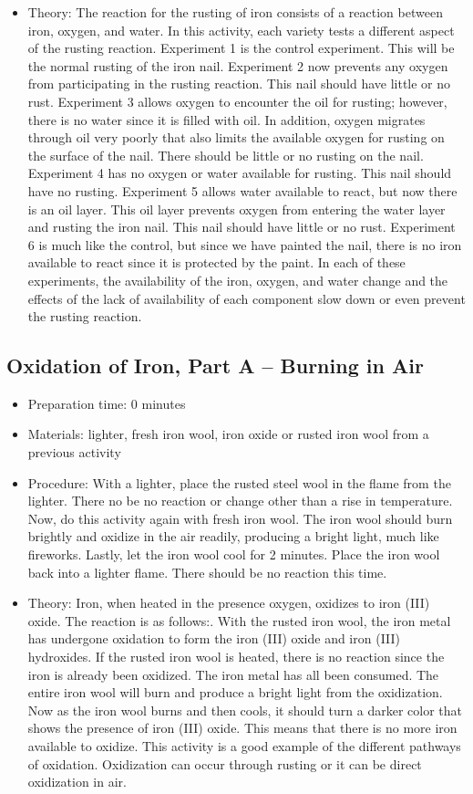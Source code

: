 \begin{itemize}
\item{Theory: The reaction for the rusting of iron consists of a reaction between iron, oxygen, and water. In this activity, each variety tests a different aspect of the rusting reaction. Experiment 1 is the control experiment. This will be the normal rusting of the iron nail. Experiment 2 now prevents any oxygen from participating in the rusting reaction. This nail should have little or no rust. Experiment 3 allows oxygen to encounter the oil for rusting; however, there is no water since it is filled with oil. In addition, oxygen migrates through oil very poorly that also limits the available oxygen for rusting on the surface of the nail. There should be little or no rusting on the nail. Experiment 4 has no oxygen or water available for rusting. This nail should have no rusting. Experiment 5 allows water available to react, but now there is an oil layer. This oil layer prevents oxygen from entering the water layer and rusting the iron nail. This nail should have little or no rust. Experiment 6 is much like the control, but since we have painted the nail, there is no iron available to react since it is protected by the paint. In each of these experiments, the availability of the iron, oxygen, and water change and the effects of the lack of availability of each component slow down or even prevent the rusting reaction.}
\end{itemize}

\subsection{Oxidation of Iron, Part A -- Burning in Air}
\begin{itemize}
\item{Preparation time: 0 minutes}
\item{Materials: lighter, fresh iron wool, iron oxide or rusted iron wool from a previous activity}
\item{Procedure: With a lighter, place the rusted steel wool in the flame from the lighter. There no be no reaction or change other than a rise in temperature. Now, do this activity again with fresh iron wool. The iron wool should burn brightly and oxidize in the air readily, producing a bright light, much like fireworks. Lastly, let the iron wool cool for 2 minutes. Place the iron wool back into a lighter flame. There should be no reaction this time.}
\item{Theory: Iron, when heated in the presence oxygen, oxidizes to iron (III) oxide. The reaction is as follows:. With the rusted iron wool, the iron metal has undergone oxidation to form the iron (III) oxide and iron (III) hydroxides. If the rusted iron wool is heated, there is no reaction since the iron is already been oxidized. The iron metal has all been consumed. The entire iron wool will burn and produce a bright light from the oxidization. Now as the iron wool burns and then cools, it should turn a darker color that shows the presence of iron (III) oxide. This means that there is no more iron available to oxidize. This activity is a good example of the different pathways of oxidation. Oxidization can occur through rusting or it can be direct oxidization in air.}
\end{itemize}

